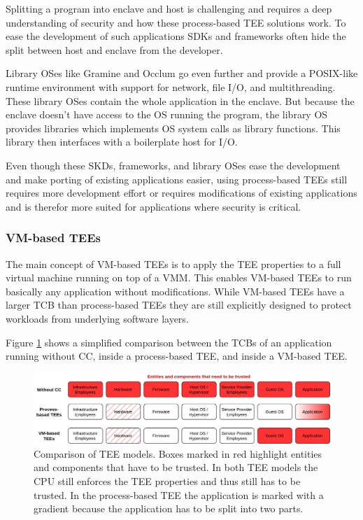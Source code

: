 
Splitting a program into enclave and host is challenging and requires a deep
understanding of security and how these process-based TEE solutions work. To
ease the development of such applications SDKs and frameworks often hide the
split between host and enclave from the developer\cite{schuster2022}.

Library OSes like Gramine and Occlum go even further and provide a POSIX-like
runtime environment with support for network, file I/O, and multithreading.
These library OSes contain the whole application in the enclave. But because the
enclave doesn't have access to the OS running the program, the library OS
provides libraries which implements OS system calls as library
functions\cite{tsai2014}. This library then interfaces with a boilerplate host
for I/O.

Even though these SKDs, frameworks, and library OSes ease the development and
make porting of existing applications easier, using process-based TEEs still
requires more development effort or requires modifications of existing
applications and is therefor more suited for applications where security is
critical.


\subsubsection{VM-based TEEs}

The main concept of VM-based TEEs is to apply the TEE properties to a full
virtual machine running on top of a VMM. This enables VM-based TEEs to run
basically any application without modifications. While VM-based TEEs have a
larger TCB than process-based TEEs they are still explicitly designed to protect
workloads from underlying software layers.


Figure \ref{figure:cc-tee-comparison} shows a simplified comparison between the
TCBs of an application running without CC, inside a process-based TEE, and
inside a VM-based TEE.

\begin{figure}
  \centering
  \includegraphics[width=\linewidth]{resources/cc-tee-comparison.png}
  \caption[Comparison of trusted execution environment models]{
    Comparison of TEE models. Boxes marked in red highlight entities and
    components that have to be trusted. In both TEE models the CPU still
    enforces the TEE properties and thus still has to be trusted. In the
    process-based TEE the application is marked with a gradient because the
    application has to be split into two parts.
  }
  \label{figure:cc-tee-comparison}
\end{figure}

